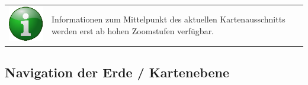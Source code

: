 \documentclass[10pt]{scrreprt}
\begin{document}
\vspace{3mm}
\begin{tabular}{>{\centering \arraybackslash}m{1cm} m{14cm}}
\includegraphics[scale=0.5]{images/info.eps} & Informationen zum Mittelpunkt des aktuellen Kartenausschnitts werden erst ab hohen Zoomstufen verfügbar.
\end{tabular}




\newpage
\subsection{Navigation der Erde / Kartenebene} 

\vspace{3mm}
\end{document}
